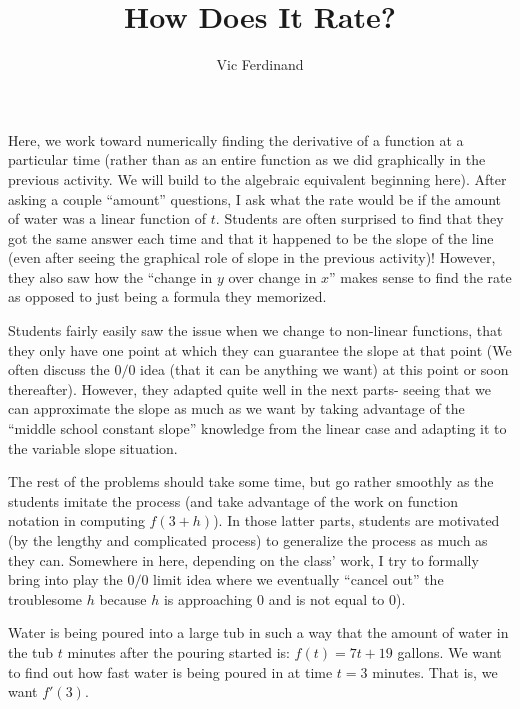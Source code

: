 \documentclass{ximera}
\author{Vic Ferdinand}
\title{How Does It Rate?}
\begin{document}
\begin{abstract}
\end{abstract}
\maketitle


\begin{instructorIntro}
Here, we work toward numerically finding the derivative of a function at a particular time (rather than as an entire function as we did graphically in the previous activity.  We will build to the algebraic equivalent beginning here).  After asking a couple ``amount'' questions, I ask what the rate would be if the amount of water was a linear function of $t$.  Students are often surprised to find that they got the same answer each time and that it happened to be the slope of the line (even after seeing the graphical role of slope in the previous activity)!  However, they also saw how the ``change in $y$ over change in $x$'' makes sense to find the rate as opposed to just being a formula they memorized.

Students fairly easily saw the issue when we change to non-linear functions, that they only have one point at which they can guarantee the slope at that point (We often discuss the $0/0$ idea (that it can be anything we want) at this point or soon thereafter).  However, they adapted quite well in the next parts- seeing that we can approximate the slope as much as we want by taking advantage of the ``middle school constant slope'' knowledge from the linear case and adapting it to the variable slope situation.

The rest of the problems should take some time, but go rather smoothly as the students imitate the process (and take advantage of the work on function notation in computing $f(3 + h)$).  In those latter parts, students are motivated (by the lengthy and complicated process) to generalize the process as much as they can.  Somewhere in here, depending on the class' work, I try to formally bring into play the $0/0$ limit idea where we eventually ``cancel out'' the troublesome $h$ because $h$ is approaching $0$ and is not equal to $0$).

\end{instructorIntro}


Water is being poured into a large tub in such a way that the amount of water in the tub $t$ minutes after the pouring started is: $f(t) = 7t+19$  gallons.  We want to find out how fast water is being poured in at time $t = 3$ minutes.  That is, we want  $f'(3)$.
\end{document}
